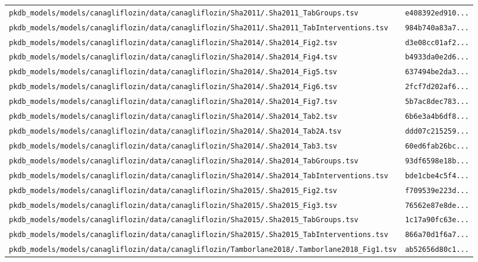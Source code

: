 \begin{longtable}{ll}
\texttt{pkdb\_models/models/canagliflozin/data/canagliflozin/Sha2011/.Sha2011\_TabGroups.tsv} & \texttt{e408392ed910...} \\
\texttt{pkdb\_models/models/canagliflozin/data/canagliflozin/Sha2011/.Sha2011\_TabInterventions.tsv} & \texttt{984b740a83a7...} \\
\texttt{pkdb\_models/models/canagliflozin/data/canagliflozin/Sha2014/.Sha2014\_Fig2.tsv} & \texttt{d3e08cc01af2...} \\
\texttt{pkdb\_models/models/canagliflozin/data/canagliflozin/Sha2014/.Sha2014\_Fig4.tsv} & \texttt{b4933da0e2d6...} \\
\texttt{pkdb\_models/models/canagliflozin/data/canagliflozin/Sha2014/.Sha2014\_Fig5.tsv} & \texttt{637494be2da3...} \\
\texttt{pkdb\_models/models/canagliflozin/data/canagliflozin/Sha2014/.Sha2014\_Fig6.tsv} & \texttt{2fcf7d202af6...} \\
\texttt{pkdb\_models/models/canagliflozin/data/canagliflozin/Sha2014/.Sha2014\_Fig7.tsv} & \texttt{5b7ac8dec783...} \\
\texttt{pkdb\_models/models/canagliflozin/data/canagliflozin/Sha2014/.Sha2014\_Tab2.tsv} & \texttt{6b6e3a4b6df8...} \\
\texttt{pkdb\_models/models/canagliflozin/data/canagliflozin/Sha2014/.Sha2014\_Tab2A.tsv} & \texttt{ddd07c215259...} \\
\texttt{pkdb\_models/models/canagliflozin/data/canagliflozin/Sha2014/.Sha2014\_Tab3.tsv} & \texttt{60ed6fab26bc...} \\
\texttt{pkdb\_models/models/canagliflozin/data/canagliflozin/Sha2014/.Sha2014\_TabGroups.tsv} & \texttt{93df6598e18b...} \\
\texttt{pkdb\_models/models/canagliflozin/data/canagliflozin/Sha2014/.Sha2014\_TabInterventions.tsv} & \texttt{bde1cbe4c5f4...} \\
\texttt{pkdb\_models/models/canagliflozin/data/canagliflozin/Sha2015/.Sha2015\_Fig2.tsv} & \texttt{f709539e223d...} \\
\texttt{pkdb\_models/models/canagliflozin/data/canagliflozin/Sha2015/.Sha2015\_Fig3.tsv} & \texttt{76562e87e8de...} \\
\texttt{pkdb\_models/models/canagliflozin/data/canagliflozin/Sha2015/.Sha2015\_TabGroups.tsv} & \texttt{1c17a90fc63e...} \\
\texttt{pkdb\_models/models/canagliflozin/data/canagliflozin/Sha2015/.Sha2015\_TabInterventions.tsv} & \texttt{866a70d1f6a7...} \\
\texttt{pkdb\_models/models/canagliflozin/data/canagliflozin/Tamborlane2018/.Tamborlane2018\_Fig1.tsv} & \texttt{ab52656d80c1...} \\

\end{longtable}
